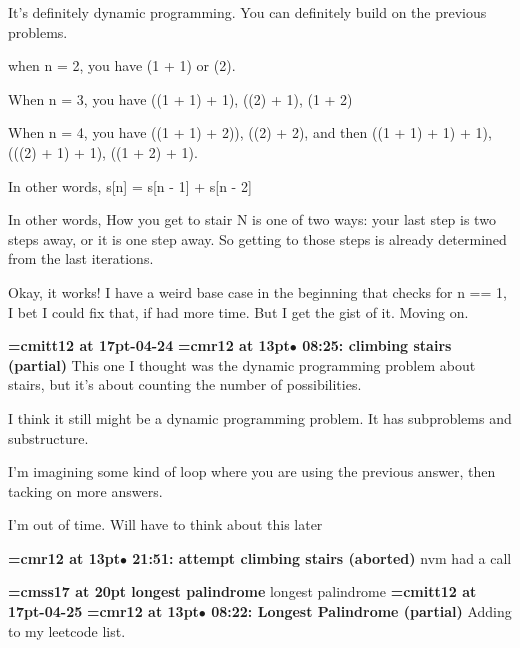 It's definitely dynamic programming. You can definitely build on the previous problems.
\par

when n = 2, you have (1 + 1) or (2).
\par

When n = 3, you have ((1 + 1) + 1), ((2) + 1), (1 + 2)
\par

When n = 4, you have ((1 + 1) + 2)), ((2) + 2), and then ((1 + 1) + 1) + 1), (((2) + 1) + 1), ((1 + 2) + 1).
\par

In other words, s[n] = s[n - 1] + s[n - 2]
\par

In other words, How you get to stair N is one of two ways: your last step is two steps away, or it is one step away. So getting to those steps is already determined from the last iterations.
\par

Okay, it works! I have a weird base case in the beginning that checks for n == 1, I bet I could fix that, if had more time. But I get the gist of it. Moving on.
\par

{\medskip\noindent\bf\font\titlefont=cmitt12 at 17pt-04-24}\medskip
{\smallskip\noindent\bf\font\titlefont=cmr12 at 13pt\titlefont $\bullet$ 08:25: climbing stairs (partial)}\smallskip
This one I thought was the dynamic programming problem about stairs, but it's about counting the number of possibilities.
\par

I think it still might be a dynamic programming problem. It has subproblems and substructure.
\par

I'm imagining some kind of loop where you are using the previous answer, then tacking on more answers.
\par

I'm out of time. Will have to think about this later
\par

{\smallskip\noindent\bf\font\titlefont=cmr12 at 13pt\titlefont $\bullet$ 21:51: attempt climbing stairs (aborted)}\smallskip
nvm had a call
\par

{\medskip\noindent\bf\font\titlefont=cmss17 at 20pt longest palindrome} longest palindrome
{\medskip\noindent\bf\font\titlefont=cmitt12 at 17pt-04-25}\medskip
{\smallskip\noindent\bf\font\titlefont=cmr12 at 13pt\titlefont $\bullet$ 08:22: Longest Palindrome (partial)}\smallskip
Adding to my leetcode list.
\par

